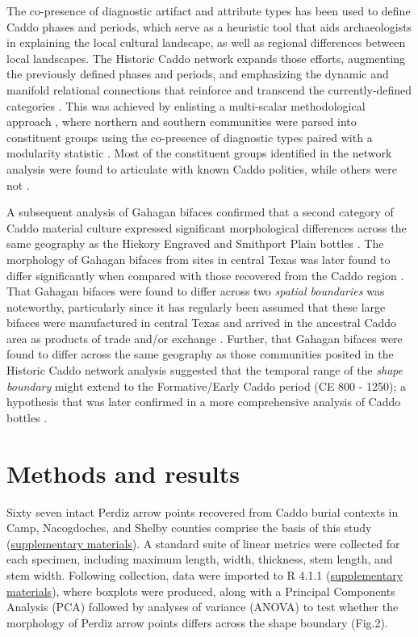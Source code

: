 \documentclass[smallextended]{svjour3}       %
\begin{document}
The co-presence of diagnostic artifact and attribute types has been used
to define Caddo phases and periods, which serve as a heuristic tool that
aids archaeologists in explaining the local cultural landscape, as well
as regional differences between local landscapes. The Historic Caddo
network expands those efforts, augmenting the previously defined phases
and periods, and emphasizing the dynamic and manifold relational
connections that reinforce and transcend the currently-defined
categories \cite{RN8031}. This was achieved by enlisting a multi-scalar
methodological approach \cite{RN5644,RN8039}, where northern and
southern communities were parsed into constituent groups using the
co-presence of diagnostic types paired with a modularity statistic
\cite{RN8051,RN8024}. Most of the constituent groups identified in the
network analysis were found to articulate with known Caddo polities,
while others were not \cite{RN8031}.

A subsequent analysis of Gahagan bifaces confirmed that a second
category of Caddo material culture expressed significant morphological
differences across the same geography as the Hickory Engraved and
Smithport Plain bottles \cite{RN8158}. The morphology of Gahagan bifaces
from sites in central Texas was later found to differ significantly when
compared with those recovered from the Caddo region \cite{RN8322}. That
Gahagan bifaces were found to differ across two \emph{spatial
boundaries} was noteworthy, particularly since it has regularly been
assumed that these large bifaces were manufactured in central Texas and
arrived in the ancestral Caddo area as products of trade and/or exchange
\cite{RN8322,RN8158}. Further, that Gahagan bifaces were found to differ
across the same geography as those communities posited in the Historic
Caddo network analysis suggested that the temporal range of the
\emph{shape boundary} might extend to the Formative/Early Caddo period
(CE 800 - 1250); a hypothesis that was later confirmed in a more
comprehensive analysis of Caddo bottles \cite{RN8312}.

\hypertarget{methods-and-results}{%
\section{Methods and results}\label{methods-and-results}}

Sixty seven intact Perdiz arrow points recovered from Caddo burial
contexts in Camp, Nacogdoches, and Shelby counties comprise the basis of
this study (\href{https://seldenlab.github.io/perdiz3/}{supplementary
materials}). A standard suite of linear metrics were collected for each
specimen, including maximum length, width, thickness, stem length, and
stem width. Following collection, data were imported to R 4.1.1
\cite{RN8584} (\href{https://seldenlab.github.io/perdiz3/}{supplementary
materials}), where boxplots were produced, along with a Principal
Components Analysis (PCA) followed by analyses of variance (ANOVA) to
test whether the morphology of Perdiz arrow points differs across the
shape boundary (Fig.2).
\end{document}
